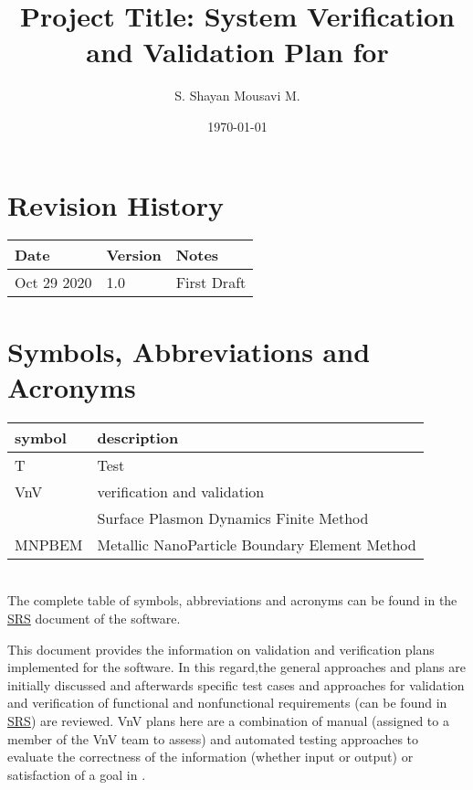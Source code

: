 \documentclass[12pt, titlepage]{article}
\begin{document}
\title{Project Title: System Verification and Validation Plan for \progname{}} 
\author{S. Shayan Mousavi M.}
\date{\today}
	
\maketitle


\section{Revision History}

\begin{tabularx}{\textwidth}{p{3cm}p{2cm}X}
\toprule {\bf Date} & {\bf Version} & {\bf Notes}\\
\midrule
Oct 29 2020& 1.0 & First Draft\\
\bottomrule
\end{tabularx}

\newpage

\tableofcontents

\listoftables

\listoffigures

\newpage

\section{Symbols, Abbreviations and Acronyms}

\renewcommand{\arraystretch}{1.2}
\begin{tabular}{l l} 
  \toprule		
  \textbf{symbol} & \textbf{description}\\
  \midrule 
  T & Test\\
  VnV & verification and validation\\
  \progname{} & Surface Plasmon Dynamics Finite Method\\
  MNPBEM & Metallic NanoParticle Boundary Element Method\\
  \bottomrule
\end{tabular}\\
The complete table of symbols, abbreviations and acronyms can be found in the \href{https://github.com/shmouses/SPDFM/tree/master/docs/SRS}{SRS} document of the software. 
\newpage


This document provides the information on validation and verification plans implemented for the \progname{} software. In this regard,the general approaches and plans are initially discussed and afterwards specific test cases and approaches for validation and verification of functional and nonfunctional requirements (can be found in \href{https://github.com/shmouses/SPDFM/tree/master/docs/SRS}{SRS}) are reviewed. VnV plans here are a combination of manual (assigned to a member of the VnV team to assess) and automated testing approaches to evaluate the correctness of the information (whether input or output) or satisfaction of a goal in \progname{}.    
\end{document}
